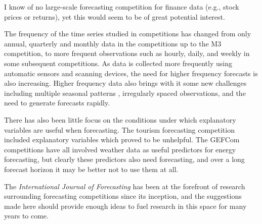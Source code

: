 \documentclass[11pt,a4paper,]{article}
\begin{document}
I know of no large-scale forecasting competition for finance data (e.g., stock prices or returns), yet this would seem to be of great potential interest.

The frequency of the time series studied in competitions has changed from only annual, quarterly and monthly data in the competitions up to the M3 competition, to more frequent observations such as hourly, daily, and weekly in some subsequent competitions. As data is collected more frequently using automatic sensors and scanning devices, the need for higher frequency forecasts is also increasing. Higher frequency data also brings with it some new challenges including multiple seasonal patterns \autocite{DHS11}, irregularly spaced observations, and the need to generate forecasts rapidly.

There has also been little focus on the conditions under which explanatory variables are useful when forecasting. The tourism forecasting competition included explanatory variables which proved to be unhelpful. The GEFCom competitions have all involved weather data as useful predictors for energy forecasting, but clearly these predictors also need forecasting, and over a long forecast horizon it may be better not to use them at all.

The \emph{International Journal of Forecasting} has been at the forefront of research surrounding forecasting competitions since its inception, and the suggestions made here should provide enough ideas to fuel research in this space for many years to come.

\printbibliography
\end{document}
